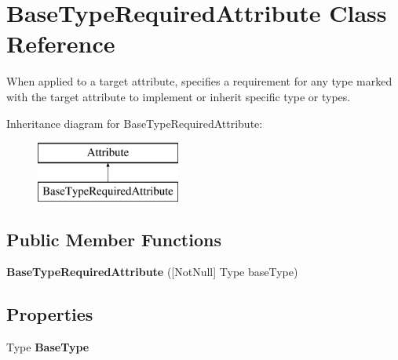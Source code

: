 \hypertarget{class_base_type_required_attribute}{}\section{Base\+Type\+Required\+Attribute Class Reference}
\label{class_base_type_required_attribute}


When applied to a target attribute, specifies a requirement for any type marked with the target attribute to implement or inherit specific type or types.  


Inheritance diagram for Base\+Type\+Required\+Attribute\+:\begin{figure}[H]
\begin{center}
\leavevmode
\includegraphics[height=2.000000cm]{class_base_type_required_attribute}
\end{center}
\end{figure}
\subsection*{Public Member Functions}
\begin{DoxyCompactItemize}
\item 
\hypertarget{class_base_type_required_attribute_a3b535405fd33291328613b6ede4e5d8a}{}{\bfseries Base\+Type\+Required\+Attribute} (\mbox{[}Not\+Null\mbox{]} Type base\+Type)\label{class_base_type_required_attribute_a3b535405fd33291328613b6ede4e5d8a}

\end{DoxyCompactItemize}
\subsection*{Properties}
\begin{DoxyCompactItemize}
\item 
\hypertarget{class_base_type_required_attribute_abd32451b36cd8eff34ecee4718e78f5b}{}Type {\bfseries Base\+Type}\label{class_base_type_required_attribute_abd32451b36cd8eff34ecee4718e78f5b}

\end{DoxyCompactItemize}


